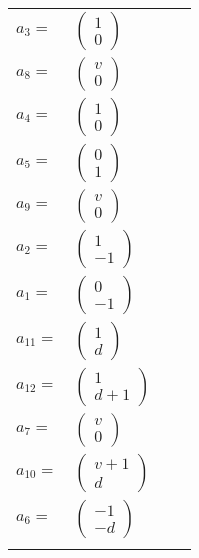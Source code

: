 \documentclass[1p]{elsarticle_modified}
\theoremstyle{definition}
\begin{document}
\begin{tabular}{m{7pt} m{180pt} m{7pt} m{180pt} }
\flushright $a_{3}=$&$\begin{pmatrix}1\\0\end{pmatrix}$ \\
\flushright $a_{8}=$&$\begin{pmatrix}v\\0\end{pmatrix}$ \\
\flushright $a_{4}=$&$\begin{pmatrix}1\\0\end{pmatrix}$ \\
\flushright $a_{5}=$&$\begin{pmatrix}0\\1\end{pmatrix}$ \\
\flushright $a_{9}=$&$\begin{pmatrix}v\\0\end{pmatrix}$ \\
\flushright $a_{2}=$&$\begin{pmatrix}1\\-1\end{pmatrix}$ \\
\flushright $a_{1}=$&$\begin{pmatrix}0\\-1\end{pmatrix}$ \\
\flushright $a_{11}=$&$\begin{pmatrix}1\\d\end{pmatrix}$ \\
\flushright $a_{12}=$&$\begin{pmatrix}1\\d+1\end{pmatrix}$ \\
\flushright $a_{7}=$&$\begin{pmatrix}v\\0\end{pmatrix}$ \\
\flushright $a_{10}=$&$\begin{pmatrix}v+1\\d\end{pmatrix}$ \\
\flushright $a_{6}=$&$\begin{pmatrix}-1\\- d\end{pmatrix}$\\&\end{tabular}
\end{document}
